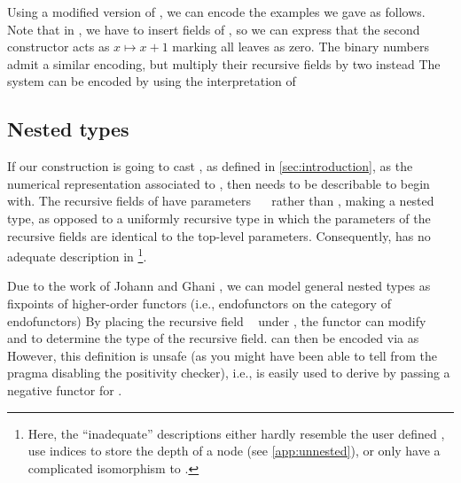 Using a modified version of , we can encode the examples we gave as follows. Note that in \bN{}, we have to insert fields of , so we can express that the second constructor acts as $x \mapsto x + 1$
marking all leaves as zero. The binary numbers admit a similar encoding, but multiply their recursive fields by two instead
The  system can be encoded by using the interpretation of 


\subsection{Nested types}
If our construction is going to cast , as defined in \autoref{sec:introduction}, as the numerical representation associated to , then  needs to be describable to begin with. The recursive fields of  have parameters \ \  rather than , making  a nested type, as opposed to a uniformly recursive type in which the parameters of the recursive fields are identical to the top-level parameters. Consequently,  has no adequate description in \footnote{Here, the ``inadequate'' descriptions either hardly resemble the user defined , use indices to store the depth of a node (see \autoref{app:unnested}), or only have a complicated isomorphism to .}. %

Due to the work of Johann and Ghani \cite{initenough}, we can model general nested types as fixpoints of higher-order functors (i.e., endofunctors on the category of endofunctors)
By placing the recursive field \  under , the functor  can modify \  and  to determine the type of the recursive field.  can then be encoded via  as
However, this definition is unsafe (as you might have been able to tell from the pragma disabling the positivity checker), i.e.,  is easily used to derive  by passing a negative functor for . %

